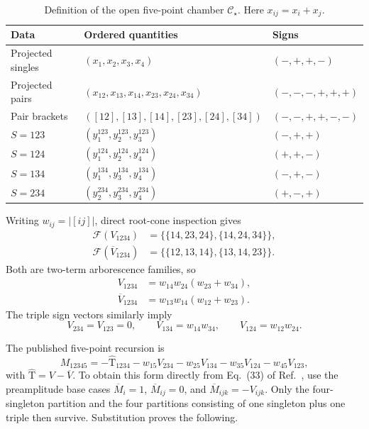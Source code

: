 \documentclass[11pt]{article}
\theoremstyle{definition}
\theoremstyle{remark}
\newcommand{\abs}[1]{\lvert #1\rvert}
\newcommand{\Vbar}{\overline V}
\newcommand{\Mhat}{\widehat{\mathrm T}}
\begin{document}
\begin{table}[ht]
\centering
\small
\begin{tabular}{@{}lll@{}}
\toprule
Data & Ordered quantities & Signs\\
\midrule
Projected singles & $(x_1,x_2,x_3,x_4)$ & $(-,+,+,-)$\\
Projected pairs & $(x_{12},x_{13},x_{14},x_{23},x_{24},x_{34})$
  & $(-,-,-,+,+,+)$\\
Pair brackets & $([12],[13],[14],[23],[24],[34])$
  & $(-,-,+,+,-,-)$\\
$S=123$ & $(y_1^{123},y_2^{123},y_3^{123})$ & $(-,+,+)$\\
$S=124$ & $(y_1^{124},y_2^{124},y_4^{124})$ & $(+,+,-)$\\
$S=134$ & $(y_1^{134},y_3^{134},y_4^{134})$ & $(-,+,-)$\\
$S=234$ & $(y_2^{234},y_3^{234},y_4^{234})$ & $(+,-,+)$\\
\bottomrule
\end{tabular}
\caption{Definition of the open five-point chamber $\mathcal C_\star$.
Here $x_{ij}=x_i+x_j$.}
\label{tab:signs}
\end{table}

Writing $w_{ij}=\abs{[ij]}$, direct root-cone inspection gives
\begin{align}
  \mathcal F(V_{1234})
    &=\bigl\{\{14,23,24\},\{14,24,34\}\bigr\},\\
  \mathcal F(\Vbar_{1234})
    &=\bigl\{\{12,13,14\},\{13,14,23\}\bigr\}.
\end{align}
Both are two-term arborescence families, so
\begin{align}\label{eq:fourvertices}
  V_{1234}&=w_{14}w_{24}(w_{23}+w_{34}),\\
  \Vbar_{1234}&=w_{13}w_{14}(w_{12}+w_{23}).
\end{align}
The triple sign vectors similarly imply
\begin{equation}\label{eq:triples}
  V_{234}=V_{123}=0,
  \qquad
  V_{134}=w_{14}w_{34},
  \qquad
  V_{124}=w_{12}w_{24}.
\end{equation}

The published five-point recursion is
\begin{equation}\label{eq:M5rec}
  M_{12345}=-\Mhat_{1234}
  -w_{15}V_{234}-w_{25}V_{134}-w_{35}V_{124}-w_{45}V_{123},
\end{equation}
with $\Mhat=V-\Vbar$.  To obtain this form directly from Eq.~(33) of
Ref.~\cite{GuevaraGraviton}, use the preamplitude base cases
$\overline M_i=1$, $\overline M_{ij}=0$, and
$\overline M_{ijk}=-V_{ijk}$.  Only the four-singleton partition and the four
partitions consisting of one singleton plus one triple then survive.
Substitution proves the following.
\end{document}
